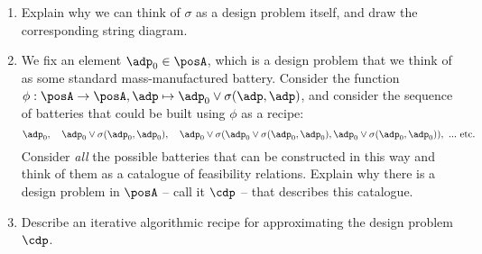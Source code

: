 \documentclass[paper=8.125in:10.250in,pagesize=pdftex,
    headinclude=false,footinclude=false,oneside,egregdoesnotlikesansseriftitles]{kaobook}
\begin{document}
\begin{gradedexercise}
\begin{enumerate}
\item Explain why we can think of $\sigma$ as a design problem itself, and draw the corresponding string diagram. 
\item We fix an element $\adp_0 \in \posA$, which is a design problem that we think of as some standard mass-manufactured battery. Consider the function $\phi : \posA \to \posA, \adp \mapsto \adp_0 \vee \sigma(\adp,\adp)$, and consider the sequence of batteries that could be built using $\phi$ as a recipe: 
$$
\adp_0, \quad \adp_0 \vee \sigma(\adp_0,\adp_0), \quad \adp_0 \vee \sigma(\adp_0 \vee \sigma(\adp_0,\adp_0), \adp_0 \vee \sigma(\adp_0,\adp_0)), \ ... \  \text{etc.}
$$
Consider \emph{all} the possible batteries that can be constructed in this way and think of them as a catalogue of feasibility relations. 
Explain why there is a design problem in $\posA$ -- call it $\cdp$ -- that describes this catalogue.
\item Describe an iterative algorithmic recipe for approximating the design problem $\cdp$. 
\end{enumerate}

\end{gradedexercise}


\clearpage
\end{document}
